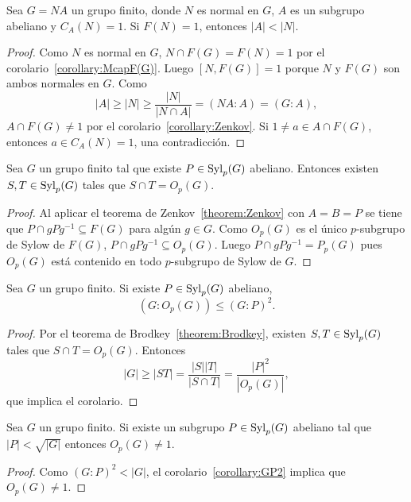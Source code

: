 \begin{corollary}
	Sea $G=NA$ un grupo finito, donde $N$ es normal en $G$, $A$ es un subgrupo
	abeliano y $C_A(N)=1$.  Si $F(N)=1$, entonces $|A|<|N|$. 
\end{corollary}

\begin{proof}
	Como $N$ es normal en $G$, 
	$N\cap F(G)=F(N)=1$ por 
	el corolario~\ref{corollary:McapF(G)}. Luego $[N,F(G)]=1$ porque
	$N$ y $F(G)$ son ambos normales en $G$.  Como 
	\[
	|A|\geq |N|\geq \frac{|N|}{|N\cap A|}=(NA:A)=(G:A),
	\]
	$A\cap F(G)\ne 1$ por el corolario~\ref{corollary:Zenkov}. Si $1\ne a\in
	A\cap F(G)$, entonces $a\in C_A(N)=1$, una contradicción.
\end{proof}

\begin{theorem}[Brodkey]
	\label{theorem:Brodkey}
	Sea $G$ un grupo finito tal que existe $P\in\mathrm{Syl}_p(G)$ abeliano. Entonces
	existen $S,T\in\mathrm{Syl}_p(G)$ tales que $S\cap T=O_p(G)$.
\end{theorem}

\begin{proof}
	Al aplicar el teorema de Zenkov~\ref{theorem:Zenkov} con $A=B=P$ se tiene
	que $P\cap gPg^{-1}\subseteq F(G)$ para algún $g\in G$. Como $O_p(G)$ es el
	único $p$-subgrupo de Sylow de $F(G)$, $P\cap gPg^{-1}\subseteq O_p(G)$.
	Luego $P\cap gPg^{-1}=P_p(G)$ pues $O_p(G)$ está contenido en todo
	$p$-subgrupo de Sylow de $G$.
\end{proof}

\begin{corollary}
	\label{corollary:GP2}
	Sea $G$ un grupo finito. Si existe $P\in \mathrm{Syl}_p(G)$ abeliano,
	\[
	(G:O_p(G))\leq (G:P)^2. 
	\]
\end{corollary}

\begin{proof}
	Por el teorema de Brodkey~\ref{theorem:Brodkey}, existen $S,T\in\mathrm{Syl}_p(G)$
	tales que $S\cap T=O_p(G)$. Entonces
	\[
		|G|\geq |ST|=\frac{|S||T|}{|S\cap T|}=\frac{|P|^2}{|O_p(G)|},
	\]
	que implica el corolario.
\end{proof}

\begin{corollary}
	Sea $G$ un grupo finito. Si existe un subgrupo $P\in\mathrm{Syl}_p(G)$ abeliano tal que
	$|P|<\sqrt{|G|}$ entonces $O_p(G)\ne1$.
\end{corollary}

\begin{proof}
	Como $(G:P)^2<|G|$, el corolario~\ref{corollary:GP2} implica que
	$O_p(G)\ne1$.
\end{proof}

